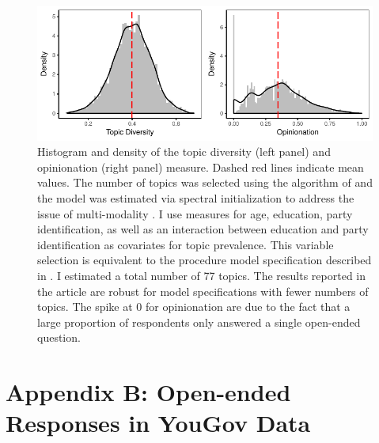\documentclass[12pt]{article}
\begin{document}
\begin{figure}[h]\centering
\includegraphics{../fig/diversity.pdf}
\caption{Histogram and density of the topic diversity (left panel) and opinionation (right panel) measure. Dashed red lines indicate mean values. The number of topics was selected using the algorithm of \citet{lee2014low} and the model was estimated via spectral initialization to address the issue of multi-modality \citep[see][for details]{roberts2014stm}. I use measures for age, education, party identification, as well as an interaction between education and party identification as covariates for topic prevalence. This variable selection is equivalent to the procedure model specification described in \citet{roberts2014structural}. I estimated a total number of 77 topics. The results reported in the article are robust for model specifications with fewer numbers of topics. The spike at 0 for opinionation are due to the fact that a large proportion of respondents only answered a single open-ended question.}\label{fig:diversity}
\end{figure}


\clearpage
\section*{Appendix B: Open-ended Responses in YouGov Data}
\renewcommand\thefigure{B.\arabic{figure}}
\renewcommand\thetable{B.\arabic{table}}
\setcounter{figure}{0}
\setcounter{table}{0}
\end{document}
